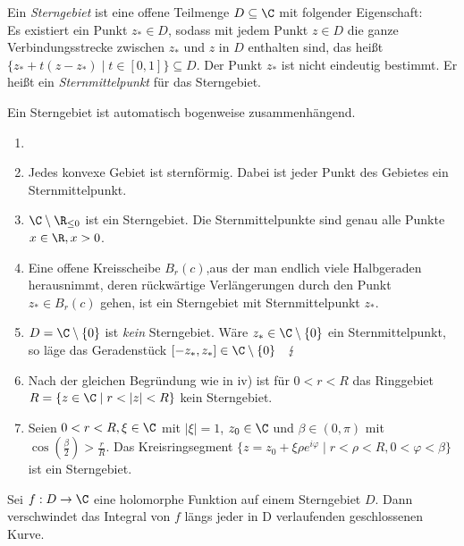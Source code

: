 \lecture
		\begin{defn}[Sterngebiet]
			Ein \emph{Sterngebiet} ist eine offene Teilmenge $ D \subseteq \C $ mit folgender Eigenschaft:\\
			Es existiert ein Punkt $ z_* \in D $, sodass mit jedem Punkt $ z \in D $ die ganze Verbindungsstrecke zwischen $z_*$ und $z$ in $D$ enthalten sind, das heißt $ \{ z_* + t(z-z_*) \mid t \in [0,1] \} \subseteq D $. Der Punkt $z_*$ ist nicht eindeutig bestimmt. Er heißt ein \emph{Sternmittelpunkt} für das Sterngebiet.
		\end{defn}
		
		\begin{rem*}
			Ein Sterngebiet ist automatisch bogenweise zusammenhängend.
		\end{rem*}
		
		\begin{exmp*}
			\begin{enumerate}[label = {\roman*})]
				\item[]
				\item Jedes konvexe Gebiet ist sternförmig. Dabei ist jeder Punkt des Gebietes ein Sternmittelpunkt.
				\item $ \C \setminus \R_{\leq 0} $ ist ein Sterngebiet. Die Sternmittelpunkte sind genau alle Punkte $ x \in \R, x > 0 $.
				\item Eine offene Kreisscheibe $ B_r(c) $,aus der man endlich viele Halbgeraden herausnimmt, deren rückwärtige Verlängerungen durch den Punkt $z_* \in B_r(c)$ gehen, ist ein Sterngebiet mit Sternmittelpunkt $z_*$.
				\item $ D = \C \setminus \{0\} $ ist \emph{kein} Sterngebiet. Wäre $ z_* \in \C \setminus\{0\} $ ein Sternmittelpunkt, so läge das Geradenstück $ [-z_*,z_*] \in \C \setminus \{0\} \quad \lightning $
				\item Nach der gleichen Begründung wie in iv) ist für $ 0<r<R $ das Ringgebiet $ R = \{ z \in \C \mid r < |z| < R \} $ kein Sterngebiet.
				\item Seien $ 0<r<R, \xi \in \C $ mit $ |\xi|=1 $, $z_0 \in \C$ und $ \beta \in (0,\pi) $ mit $ \cos\left(\frac{\beta}{2}\right) > \frac{r}{R} $. Das Kreisringsegment $ \{ z = z_0 + \xi\rho e^{i\varphi} \mid r<\rho<R, 0<\varphi<\beta \} $ ist ein Sterngebiet.
			\end{enumerate}
		\end{exmp*}
		
		\begin{thmn}
			Sei $ f: D \to \C $ eine holomorphe Funktion auf einem Sterngebiet $D$. Dann verschwindet das Integral von $f$ längs jeder in D verlaufenden geschlossenen Kurve.
		\end{thmn}
		
